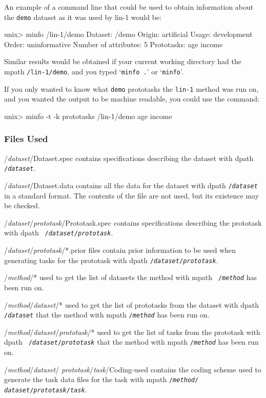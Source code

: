 An example of a command line that could be used to obtain information
about the \texttt{demo} dataset as it was used by lin-1 would be:
\begin{Session}
unix> minfo /lin-1/demo
Dataset: /demo
Origin: artificial
Usage: development
Order: uninformative
Number of attributes: 5
Prototasks: 
        age
        income
\end{Session}
Similar results would be obtained if your current working directory
had the mpath \mbox{\texttt{/lin-1/demo}}, and you typed
`\texttt{minfo .}' or `\texttt{minfo}'.

If you only wanted to know what \texttt{demo} prototasks the \texttt{lin-1}
method was run on, and you wanted the output to be machine readable,
you could use the command:
\begin{Session}
unix> minfo -t -k prototasks /lin-1/demo
age income
\end{Session}

\subsubsection*{Files Used}
\begin{ttdescription}
\item[/{\rm\em dataset\/}/Dataset.spec]
    contains specifications describing the dataset with dpath
    \texttt{/{\rm\em dataset}}.
\item[/{\rm\em dataset\/}/Dataset.data]
    contains all the data for the dataset with dpath
    \texttt{/{\rm\em dataset}} in a \delve{} standard format.  The contents of
    the file are not used, but its existence may be checked.
\item[/{\rm\em dataset\/}/{\rm\em prototask\/}/Prototask.spec]
    contains specifications describing the prototask with dpath {\tt
    /{\rm\em dataset\/}/{\rm\em prototask}}.
\item[/{\rm\em dataset\/}/{\rm\em prototask\/}/*.prior]
    files contain prior information to be used when generating tasks for the 
    prototask with dpath \texttt{/{\rm\em dataset\/}/{\rm\em prototask}}.
\item[/{\rm\em method\/}/*]
    used to get the list of datasets the method with mpath {\tt
    /{\rm\em method}} has been run on.
\item[/{\rm\em method\/}/{\rm\em dataset\/}/*]
    used to get the list of prototasks from the dataset with dpath
    \texttt{/{\rm\em dataset}} that the method with mpath 
    \texttt{/{\rm\em method}} has been run on.
\item[/{\rm\em method\/}/{\rm\em dataset\/}/{\rm\em prototask\/}/*]
    used to get the list of tasks from the prototask with dpath {\tt
    /{\rm\em dataset\/}/{\rm\em prototask}} that the method with mpath 
    \texttt{/{\rm\em method}} has been run on.
\item[/{\rm\em method\/}/{\rm\em dataset\/}/{\rm\em 
       prototask\/}/{\rm\em task\/}/Coding-used]
    contains the coding scheme used to generate the task data files
    for the task with mpath \texttt{/{\rm\em method\/}/{\rm\em 
    dataset\/}/{\rm\em prototask\/}/{\rm\em task}}.
\end{ttdescription}

